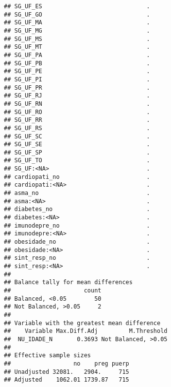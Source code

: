 \documentclass[
]{article}
\begin{document}
\begin{verbatim}
## SG_UF_ES                              .
## SG_UF_GO                              .
## SG_UF_MA                              .
## SG_UF_MG                              .
## SG_UF_MS                              .
## SG_UF_MT                              .
## SG_UF_PA                              .
## SG_UF_PB                              .
## SG_UF_PE                              .
## SG_UF_PI                              .
## SG_UF_PR                              .
## SG_UF_RJ                              .
## SG_UF_RN                              .
## SG_UF_RO                              .
## SG_UF_RR                              .
## SG_UF_RS                              .
## SG_UF_SC                              .
## SG_UF_SE                              .
## SG_UF_SP                              .
## SG_UF_TO                              .
## SG_UF:<NA>                            .
## cardiopati_no                         .
## cardiopati:<NA>                       .
## asma_no                               .
## asma:<NA>                             .
## diabetes_no                           .
## diabetes:<NA>                         .
## imunodepre_no                         .
## imunodepre:<NA>                       .
## obesidade_no                          .
## obesidade:<NA>                        .
## sint_resp_no                          .
## sint_resp:<NA>                        .
## 
## Balance tally for mean differences
##                     count
## Balanced, <0.05        50
## Not Balanced, >0.05     2
## 
## Variable with the greatest mean difference
##    Variable Max.Diff.Adj         M.Threshold
##  NU_IDADE_N       0.3693 Not Balanced, >0.05
## 
## Effective sample sizes
##                  no    preg puerp
## Unadjusted 32081.   2904.     715
## Adjusted    1062.01 1739.87   715
\end{verbatim}
\end{document}
